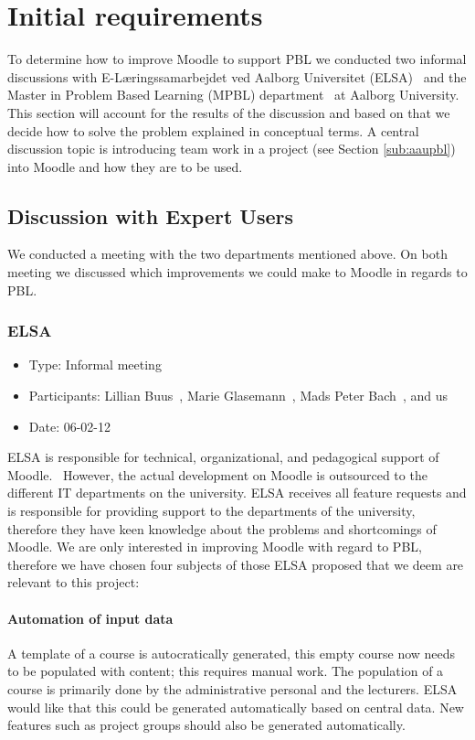 \chapter{Initial requirements}
\label{sec:initialAnalysis}
To determine how to improve Moodle to support PBL we conducted two informal discussions with E-Læringssamarbejdet ved Aalborg Universitet (ELSA)~\cite{elsa} and the Master in Problem Based Learning (MPBL) department~\cite{mpbl} at Aalborg University.
This section will account for the results of the discussion and based on that we decide how to solve the problem explained in conceptual terms.
A central discussion topic is introducing team work in a project (see Section \ref{sub:aaupbl}) into Moodle and how they are to be used.

\section{Discussion with Expert Users}  
\label{sub:expertUsers} 
We conducted a meeting with the two departments mentioned above. 
On both meeting we discussed which improvements we could make to Moodle in regards to PBL.  

\subsection{ELSA}
\label{sub:elsaInterview}
\begin{itemize}
	\item Type: Informal meeting
	\item Participants: Lillian Buus~\cite{lillian}, Marie Glasemann~\cite{marie}, Mads Peter Bach~\cite{mads}, and us 
	\item Date: 06-02-12
\end{itemize}
ELSA is responsible for technical, organizational, and pedagogical support of Moodle.~\cite{elsa} 
However, the actual development on Moodle is outsourced to the different IT departments on the university. 
ELSA receives all feature requests and is responsible for providing support to the departments of the university, therefore they have keen knowledge about the problems and shortcomings of Moodle. 
We are only interested in improving Moodle with regard to PBL, therefore we have chosen four subjects of those ELSA proposed that we deem are relevant to this project:

\subsubsection{Automation of input data} A template of a course is autocratically generated, this empty course now needs to be populated with content; this requires manual work. 
The population of a course is primarily done by the administrative personal and the lecturers. 
ELSA would like that this could be generated automatically based on central data. 
New features such as project groups should also be generated automatically.

